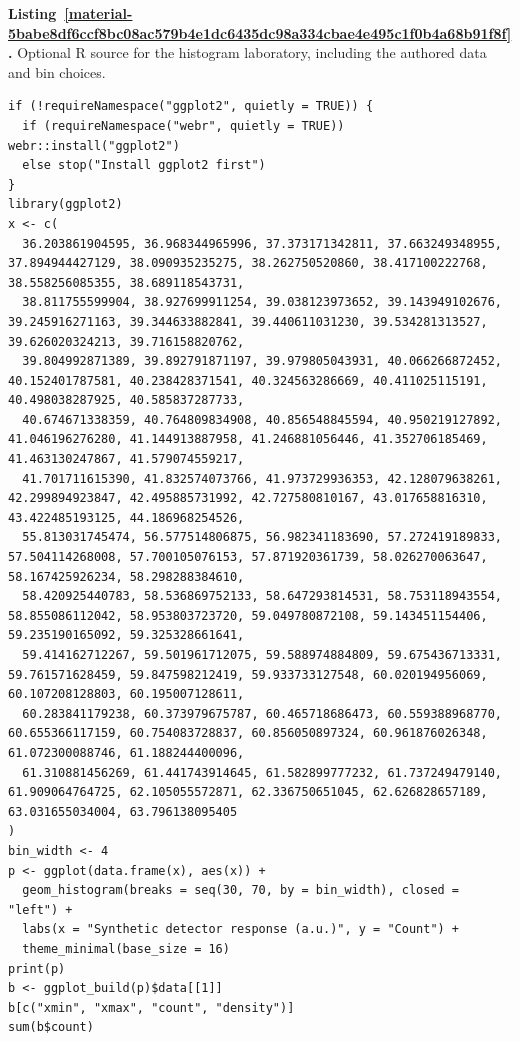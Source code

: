 \documentclass[11pt,a4paper]{article}
\newcounter{listing}
\begin{document}
\par\medskip
{}
\label{material-5babe8df6ccf8bc08ac579b4e1dc6435dc98a334cbae4e495c1f0b4a68b91f8f}
\noindent\textbf{Listing~\ref*{material-5babe8df6ccf8bc08ac579b4e1dc6435dc98a334cbae4e495c1f0b4a68b91f8f}.} Optional R source for the histogram laboratory, including the authored data and bin choices.\par\nopagebreak
\begin{Verbatim}[fontsize=\footnotesize,breaklines=true,breakanywhere=true]
if (!requireNamespace("ggplot2", quietly = TRUE)) {
  if (requireNamespace("webr", quietly = TRUE)) webr::install("ggplot2")
  else stop("Install ggplot2 first")
}
library(ggplot2)
x <- c(
  36.203861904595, 36.968344965996, 37.373171342811, 37.663249348955, 37.894944427129, 38.090935235275, 38.262750520860, 38.417100222768, 38.558256085355, 38.689118543731,
  38.811755599904, 38.927699911254, 39.038123973652, 39.143949102676, 39.245916271163, 39.344633882841, 39.440611031230, 39.534281313527, 39.626020324213, 39.716158820762,
  39.804992871389, 39.892791871197, 39.979805043931, 40.066266872452, 40.152401787581, 40.238428371541, 40.324563286669, 40.411025115191, 40.498038287925, 40.585837287733,
  40.674671338359, 40.764809834908, 40.856548845594, 40.950219127892, 41.046196276280, 41.144913887958, 41.246881056446, 41.352706185469, 41.463130247867, 41.579074559217,
  41.701711615390, 41.832574073766, 41.973729936353, 42.128079638261, 42.299894923847, 42.495885731992, 42.727580810167, 43.017658816310, 43.422485193125, 44.186968254526,
  55.813031745474, 56.577514806875, 56.982341183690, 57.272419189833, 57.504114268008, 57.700105076153, 57.871920361739, 58.026270063647, 58.167425926234, 58.298288384610,
  58.420925440783, 58.536869752133, 58.647293814531, 58.753118943554, 58.855086112042, 58.953803723720, 59.049780872108, 59.143451154406, 59.235190165092, 59.325328661641,
  59.414162712267, 59.501961712075, 59.588974884809, 59.675436713331, 59.761571628459, 59.847598212419, 59.933733127548, 60.020194956069, 60.107208128803, 60.195007128611,
  60.283841179238, 60.373979675787, 60.465718686473, 60.559388968770, 60.655366117159, 60.754083728837, 60.856050897324, 60.961876026348, 61.072300088746, 61.188244400096,
  61.310881456269, 61.441743914645, 61.582899777232, 61.737249479140, 61.909064764725, 62.105055572871, 62.336750651045, 62.626828657189, 63.031655034004, 63.796138095405
)
bin_width <- 4
p <- ggplot(data.frame(x), aes(x)) +
  geom_histogram(breaks = seq(30, 70, by = bin_width), closed = "left") +
  labs(x = "Synthetic detector response (a.u.)", y = "Count") +
  theme_minimal(base_size = 16)
print(p)
b <- ggplot_build(p)$data[[1]]
b[c("xmin", "xmax", "count", "density")]
sum(b$count)
\end{Verbatim}
\end{document}
